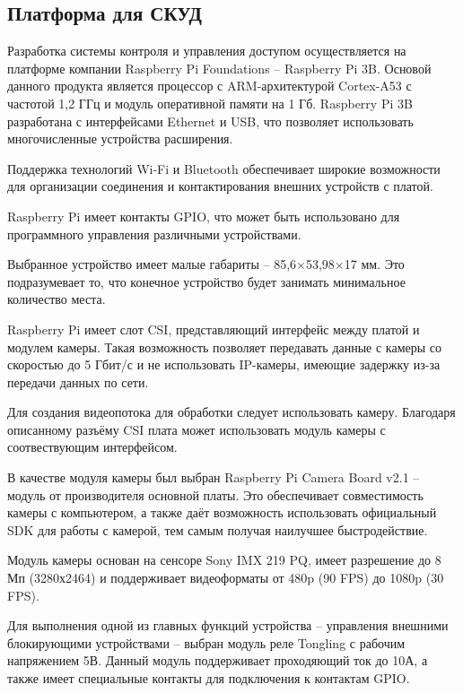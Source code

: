 \subsection{Платформа для СКУД}

Разработка системы контроля и управления доступом осуществляется на платформе компании Raspberry Pi Foundations -- Raspberry Pi 3B. Основой данного продукта является процессор с ARM-архитектурой Cortex-A53 с частотой  1,2 ГГц и модуль оперативной памяти на 1 Гб. Raspberry Pi 3B разработана с интерфейсами Ethernet и USB, что позволяет использовать многочисленные устройства расширения. 

Поддержка технологий Wi-Fi и Bluetooth обеспечивает широкие возможности для организации соединения и контактирования внешних устройств с платой.

Raspberry Pi имеет контакты GPIO, что может быть использовано для программного управления различными устройствами.

Выбранное устройство имеет малые габариты -- 85,6×53,98×17 мм. Это подразумевает то, что конечное устройство будет занимать минимальное количество места.


Raspberry Pi имеет слот CSI, представляющий интерфейс между платой и модулем камеры. Такая возможность позволяет передавать данные с камеры со скоростью до 5 Гбит/с и не использовать IP-камеры, имеющие задержку из-за передачи данных по сети.

Для создания видеопотока для обработки следует использовать камеру. Благодаря описанному разъёму CSI плата может использовать модуль камеры с соотвествующим интерфейсом.

В качестве модуля камеры был выбран Raspberry Pi Camera Board v2.1 -- модуль от производителя основной платы. Это обеспечивает совместимость камеры с компьютером, а также даёт возможность использовать официальный SDK для работы с камерой, тем самым получая наилучшее быстродействие.


Модуль камеры основан на сенсоре Sony IMX 219 PQ, имеет разрешение до 8 Мп (3280х2464) и поддерживает видеоформаты от 480p (90 FPS) до 1080p (30 FPS).

Для выполнения одной из главных функций устройства -- управления внешними блокирующими устройствами -- выбран модуль реле Tongling с рабочим напряжением 5В. Данный модуль поддерживает проходяющий ток до 10А, а также имеет специальные контакты для подключения к контактам GPIO.

